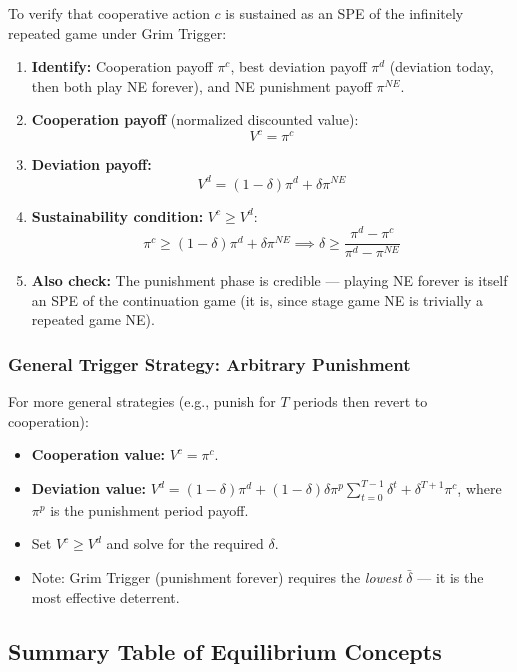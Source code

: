 \documentclass[hidelinks]{article}
\begin{document}
To verify that cooperative action $c$ is sustained as an SPE of the infinitely repeated game under Grim Trigger:

\begin{enumerate}
    \item \textbf{Identify:} Cooperation payoff $\pi^c$, best deviation payoff $\pi^d$ (deviation today, then both play NE forever), and NE punishment payoff $\pi^{NE}$.
    \item \textbf{Cooperation payoff} (normalized discounted value):
    \[
    V^c = \pi^c
    \]
    \item \textbf{Deviation payoff:}
    \[
    V^d = (1-\delta)\pi^d + \delta \pi^{NE}
    \]
    \item \textbf{Sustainability condition:} $V^c \geq V^d$:
    \[
    \pi^c \geq (1-\delta)\pi^d + \delta \pi^{NE} \implies \delta \geq \frac{\pi^d - \pi^c}{\pi^d - \pi^{NE}}
    \]
    \item \textbf{Also check:} The punishment phase is credible — playing NE forever is itself an SPE of the continuation game (it is, since stage game NE is trivially a repeated game NE).
\end{enumerate}

\subsubsection{General Trigger Strategy: Arbitrary Punishment}

For more general strategies (e.g., punish for $T$ periods then revert to cooperation):

\begin{itemize}
    \item \textbf{Cooperation value:} $V^c = \pi^c$.
    \item \textbf{Deviation value:} $V^d = (1-\delta)\pi^d + (1-\delta)\delta \pi^p \sum_{t=0}^{T-1} \delta^t + \delta^{T+1} \pi^c$, where $\pi^p$ is the punishment period payoff.
    \item Set $V^c \geq V^d$ and solve for the required $\delta$.
    \item Note: Grim Trigger (punishment forever) requires the \textit{lowest} $\bar\delta$ — it is the most effective deterrent.
\end{itemize}

\subsection{Summary Table of Equilibrium Concepts}
\end{document}
